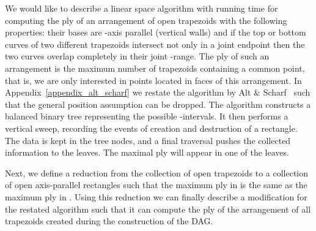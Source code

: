 We would like to describe a linear space
algorithm with  running time
for computing the ply of an arrangement of
open trapezoids with the following properties:
their bases are -axis parallel (vertical walls) and if
the top or bottom curves of two different trapezoids intersect
not only in a joint endpoint
then the two curves overlap completely in their joint -range.
The ply of such an arrangement is the maximum
number of trapezoids containing a common point,
that is, we are only interested in points located
in faces of this arrangement.
In Appendix~\ref{appendix_alt_scharf} we restate the algorithm by Alt \& Scharf~\cite{as-cdaaa-13}
such that the general position assumption can be dropped.
The algorithm constructs a balanced binary tree representing the possible -intervals.
It then performs a vertical sweep, recording the events of creation and destruction of a rectangle.
The data is kept in the tree nodes, and a final traversal pushes the collected information to the leaves.
The maximal ply will appear in one of the leaves.

Next, we define a reduction from
the collection of open trapezoids \Tall to a collection \Rall of
open axis-parallel rectangles such that the maximum ply in \Arr{\Rall}
is the same as the maximum ply in \Arr{\Tall}.
Using this reduction we can finally
describe a modification for the
restated algorithm such that it can compute the ply of
the arrangement of all trapezoids
created during the
construction of the DAG.




